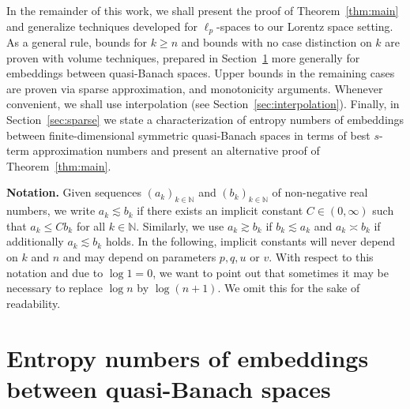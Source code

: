 \documentclass[a4paper,12pt]{article}
\theoremstyle{definition}
\newcommand{\IN}{\mathbb{N}}
\begin{document}
In the remainder of this work, we shall present the proof of Theorem~\ref{thm:main} and generalize techniques developed for $\ell_p$-spaces to our Lorentz space setting. As a general rule, bounds for $k\ge n$ and bounds with no case distinction on $k$ are proven with volume techniques, prepared in Section~\ref{sec:volume} more generally for embeddings between quasi-Banach spaces. Upper bounds in the remaining cases are proven via sparse approximation, and monotonicity arguments. Whenever convenient, we shall use interpolation (see Section~\ref{sec:interpolation}). Finally, in Section~\ref{sec:sparse} we state a characterization of entropy numbers of embeddings between finite-dimensional symmetric quasi-Banach spaces in terms of best $s$-term approximation numbers and present an alternative proof of Theorem~\ref{thm:main}.

\textbf{Notation.} Given sequences $(a_k)_{k\in\IN}$ and $(b_k)_{k\in\IN}$ of non-negative real numbers, we write $a_k\lesssim b_k$ if there exists an implicit constant $C\in(0,\infty)$ such that $a_k\le Cb_k$ for all $k\in\IN$. Similarly, we use $a_k\gtrsim b_k$ if $b_k\lesssim a_k$ and $a_k\asymp b_k$ if additionally $a_k\lesssim b_k$ holds. In the following, implicit constants will never depend on $k$ and $n$ and may depend on parameters $p,q,u$ or $v$. With respect to this notation and due to $\log 1=0$, we want to point out that sometimes it may be necessary to replace $\log n$ by $\log(n+1)$. We omit this for the sake of readability.

\section{Entropy numbers of embeddings between quasi-Banach spaces}\label{sec:volume}
\end{document}
